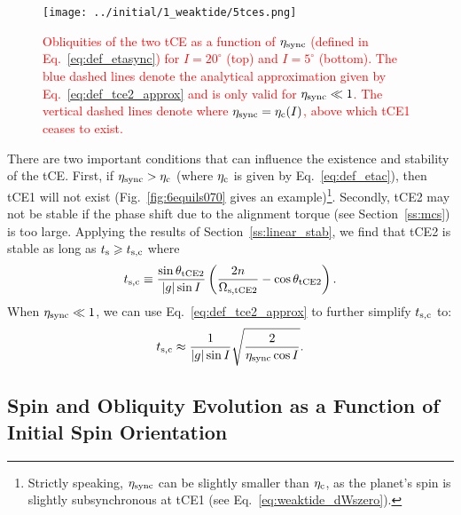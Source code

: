 \documentclass[
        fleqn,
        usenatbib,
        referee
    ]{mnras}
\newcommand*{\abs}[1]{\left|#1\right|}
\newcommand*{\p}[1]{\left(#1\right)}
\newlength{\colummwidth}
\begin{document}
\begin{figure}
    \centering
    \texttt{[image: ../initial/1\_weaktide/5tces.png]}
    \caption{\textcolor{red}{Obliquities of the two tCE as a function of
    $\eta_{\rm sync}$ (defined in Eq.~\ref{eq:def_etasync}) for $I = 20^\circ$
    (top) and $I = 5^\circ$ (bottom). The blue dashed lines denote the
    analytical approximation given by Eq.~\eqref{eq:def_tce2_approx} and is only
    valid for $\eta_{\rm sync} \ll 1$. The vertical dashed lines denote where
    $\eta_{\rm sync} = \eta_{\rm c}(I)$, above which tCE1 ceases to
    exist.}}\label{fig:tCEs}
\end{figure}

There are two important conditions that can influence the existence and stability
of the tCE\@. First, if $\eta_{\rm sync} > \eta_{\rm c}$ (where $\eta_{\rm c}$ is
given by Eq.~\ref{eq:def_etac}), then tCE1 will not
exist (Fig.~\ref{fig:6equils070} gives an example)\footnote{Strictly speaking,
$\eta_{\rm sync}$ can be slightly smaller than $\eta_{\rm c}$, as the planet's
spin is slightly subsynchronous at tCE1 (see Eq.~\ref{eq:weaktide_dWszero}).}.
Secondly, tCE2 may not be stable if the phase shift due to the alignment torque
(see Section~\ref{ss:mcs}) is too large. Applying
the results of Section~\ref{ss:linear_stab}, we find that tCE2 is stable as long
as $t_{\rm s} \geq t_{\rm s, c}$ where
\begin{equation}
    t_{\rm s, c} \equiv \frac{\sin \theta_{\rm tCE2}}{\abs{g} \sin
            I}\p{\frac{2n}{\Omega_{\rm s, tCE2}} - \cos \theta_{\rm tCE2}}.
\end{equation}
When $\eta_{\rm sync} \ll 1$, we can use Eq.~\eqref{eq:def_tce2_approx} to
further simplify $t_{\rm s, c}$ to:
\begin{equation}
    t_{\rm s, c}\approx \frac{1}{\abs{g}\sin I}\sqrt{\frac{2}{\eta_{\rm sync}
        \cos I}}. \label{eq:def_ts_crit}
\end{equation}

\subsection{Spin and Obliquity Evolution as a Function of Initial Spin
Orientation}
\end{document}
